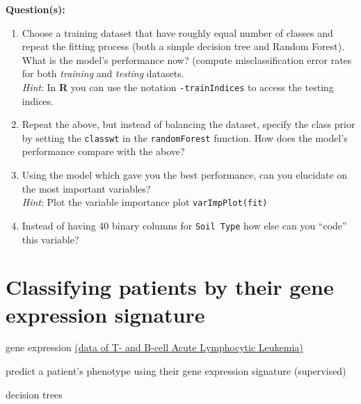 \documentclass[a4paper,11pt]{article}
\begin{document}
\begin{framed}
\textbf{Question(s):}
\begin{enumerate}
	\item Choose a training dataset that have roughly equal number of classes and repeat the fitting process (both a simple decision tree 
	and Random Forest). What is the model's performance now? (compute misclassification error rates for both \textit{training} and \textit{testing} datasets.
	\\
	\textit{Hint}: In \textbf{R} you can use the notation \texttt{-trainIndices} to access the testing indices.
	\item Repeat the above, but instead of balancing the dataset, specify the class prior by setting the \texttt{classwt} in the \texttt{randomForest} function.
	How does the model's performance compare with the above?
	\item Using the model which gave you the best performance, can you elucidate on the most important variables? 
	\\
	\textit{Hint}: Plot the variable importance plot \texttt{varImpPlot(fit)} 
	\item Instead of having 40 binary columns for \texttt{Soil Type} how else can you ``code'' this variable?
\end{enumerate}
\end{framed}

\clearpage
\section{Classifying patients by their gene expression signature}
\begin{framed}
\begin{description}[leftmargin=5em,style=nextline]\addtolength{\itemsep}{-0.2\baselineskip}
	\item[Data:] gene expression \href{http://www.bioconductor.org/packages/release/data/experiment/html/ALL.html}{(data of T- and B-cell Acute Lymphocytic Leukemia)}	
	\item[Task:] predict a patient's phenotype using their gene expression signature (supervised)
	\item[Method:] decision trees
\end{description} 
\end{framed}
\end{document}

